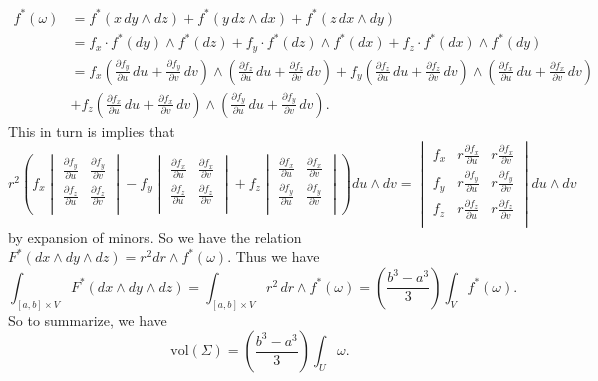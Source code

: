 \documentclass[11pt,letterpaper]{article}
\begin{document}
\begin{solution}
    \[
        \begin{aligned}
            f^*(\omega)&=f^*(x\,dy\wedge dz)+f^*(y\,dz\wedge dx)+f^*(z\,dx\wedge dy)\\
            &= f_x\cdot f^*(dy)\wedge f^*(dz)+f_y\cdot f^*(dz)\wedge f^*(dx)+f_z\cdot f^*(dx)\wedge f^*(dy)\\
            &=f_x\left(\frac{\partial f_y}{\partial u}\, du+\frac{\partial f_y}{\partial v}\,dv\right)\wedge \left(\frac{\partial f_z}{\partial u}\, du+\frac{\partial f_z}{\partial v}\,dv\right)
            +f_y\left(\frac{\partial f_z}{\partial u}\, du+\frac{\partial f_z}{\partial v}\,dv\right)\wedge \left(\frac{\partial f_x}{\partial u}\, du+\frac{\partial f_x}{\partial v}\,dv\right)\\
            &+f_z\left(\frac{\partial f_x}{\partial u}\, du+\frac{\partial f_x}{\partial v}\,dv\right)\wedge\left(\frac{\partial f_y}{\partial u}\, du+\frac{\partial f_y}{\partial v}\,dv\right).
        \end{aligned}
    \]   
    This in turn is implies that
    \[
        r^2\left(f_x\begin{vmatrix}
            \frac{\partial f_y}{\partial u}&\frac{\partial f_y}{\partial v}\\[1ex]
            \frac{\partial f_z}{\partial u}&\frac{\partial f_z}{\partial v}\\
        \end{vmatrix} - f_y\begin{vmatrix}
            \frac{\partial f_x}{\partial u}&\frac{\partial f_x}{\partial v}\\[1ex]
            \frac{\partial f_z}{\partial u}&\frac{\partial f_z}{\partial v}\\
        \end{vmatrix} + f_z\begin{vmatrix}
            \frac{\partial f_x}{\partial u}& \frac{\partial f_x}{\partial v}\\[1ex]
            \frac{\partial f_y}{\partial u}& \frac{\partial f_y}{\partial v}\\
        \end{vmatrix}\right) du\wedge dv = \begin{vmatrix}
            f_x&r\frac{\partial f_x}{\partial u}&r\frac{\partial f_x}{\partial v}\\[1ex]
            f_y&r\frac{\partial f_y}{\partial u}&r\frac{\partial f_y}{\partial v}\\[1ex]
            f_z&r\frac{\partial f_z}{\partial u}&r\frac{\partial f_z}{\partial v}\\
        \end{vmatrix} du\wedge dv
    \]
    by expansion of minors. So we have the relation $F^*(dx\wedge dy\wedge dz)={r^2}dr\wedge f^*(\omega)$. Thus we have
    \[
        \int_{[a,b]\times V} F^*(dx\wedge dy\wedge dz)=\int_{[a,b]\times V} r^2\,dr\wedge f^*(\omega)=\left(\frac{b^3-a^3}{3}\right)\int_V f^*(\omega)
    .\] 
    So to summarize, we have
    \[
        \textrm{vol}(\Sigma) = \left(\frac{b^3-a^3}{3}\right)\int_U \omega
    .\] 
    

\end{solution}
\end{document}
